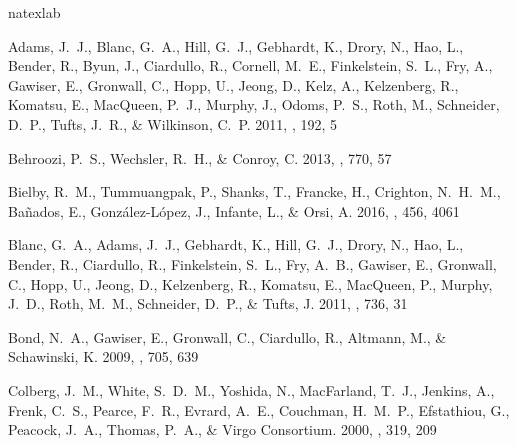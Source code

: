 \documentclass{emulateapj}
\begin{document}

%
\begin{thebibliography}{38}
\expandafter\ifx\csname natexlab\endcsname\relax\def\natexlab#1{#1}\fi

{Adams}, J.~J., {Blanc}, G.~A., {Hill}, G.~J., {Gebhardt}, K., {Drory}, N.,
  {Hao}, L., {Bender}, R., {Byun}, J., {Ciardullo}, R., {Cornell}, M.~E.,
  {Finkelstein}, S.~L., {Fry}, A., {Gawiser}, E., {Gronwall}, C., {Hopp}, U.,
  {Jeong}, D., {Kelz}, A., {Kelzenberg}, R., {Komatsu}, E., {MacQueen}, P.~J.,
  {Murphy}, J., {Odoms}, P.~S., {Roth}, M., {Schneider}, D.~P., {Tufts}, J.~R.,
  \& {Wilkinson}, C.~P. 2011, \apjs, 192, 5

{Behroozi}, P.~S., {Wechsler}, R.~H., \& {Conroy}, C. 2013, \apj, 770, 57

{Bielby}, R.~M., {Tummuangpak}, P., {Shanks}, T., {Francke}, H., {Crighton},
  N.~H.~M., {Ba{\~n}ados}, E., {Gonz{\'a}lez-L{\'o}pez}, J., {Infante}, L., \&
  {Orsi}, A. 2016, \mnras, 456, 4061

{Blanc}, G.~A., {Adams}, J.~J., {Gebhardt}, K., {Hill}, G.~J., {Drory}, N.,
  {Hao}, L., {Bender}, R., {Ciardullo}, R., {Finkelstein}, S.~L., {Fry}, A.~B.,
  {Gawiser}, E., {Gronwall}, C., {Hopp}, U., {Jeong}, D., {Kelzenberg}, R.,
  {Komatsu}, E., {MacQueen}, P., {Murphy}, J.~D., {Roth}, M.~M., {Schneider},
  D.~P., \& {Tufts}, J. 2011, \apj, 736, 31

{Bond}, N.~A., {Gawiser}, E., {Gronwall}, C., {Ciardullo}, R., {Altmann}, M.,
  \& {Schawinski}, K. 2009, \apj, 705, 639

{Colberg}, J.~M., {White}, S.~D.~M., {Yoshida}, N., {MacFarland}, T.~J.,
  {Jenkins}, A., {Frenk}, C.~S., {Pearce}, F.~R., {Evrard}, A.~E., {Couchman},
  H.~M.~P., {Efstathiou}, G., {Peacock}, J.~A., {Thomas}, P.~A., \& {Virgo
  Consortium}. 2000, \mnras, 319, 209


\end{thebibliography}
\end{document}
